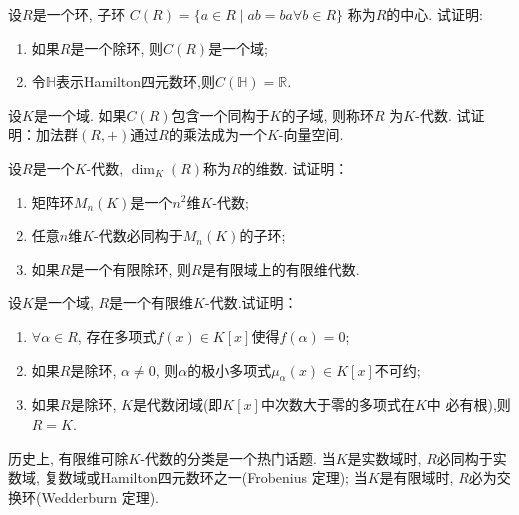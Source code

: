 \begin{solution}
    
\end{solution}

\begin{problem}
    设$R$是一个环, 子环
$C(R) = \{a \in R \mid ab = ba \forall b \in R\}$
称为$R$的中心. 试证明:
\begin{enumerate}[(1)]
    \item 如果$R$是一个除环, 则$C(R)$是一个域;
    \item 令$\mathbb{H}$表示Hamilton四元数环,则$C(\mathbb{H}) = \mathbb{R}$.
\end{enumerate}
\end{problem}

\begin{solution}
    
\end{solution}

\begin{problem}
    设$K$是一个域. 如果$C(R)$包含一个同构于$K$的子域, 则称环$R$
为$K$-代数. 试证明：加法群$(R, +)$通过$R$的乘法成为一个$K$-向量空间.
\end{problem}

\begin{solution}
    
\end{solution}

\begin{problem}
    设$R$是一个$K$-代数, $\dim_K(R)$称为$R$的维数.
试证明：
\begin{enumerate}[(1)]
    \item 矩阵环$M_n(K)$是一个$n^2$维$K$-代数;
    \item 任意$n$维$K$-代数必同构于$M_n(K)$的子环;
    \item 如果$R$是一个有限除环, 则$R$是有限域上的有限维代数.
\end{enumerate}
\end{problem}

\begin{solution}
    
\end{solution}

\begin{problem}
    设$K$是一个域, $R$是一个有限维$K$-代数.试证明：
\begin{enumerate}[(1)]
    \item $\forall \alpha \in R$, 存在多项式$f(x) \in K[x]$使得$f(\alpha) = 0$;
    \item 如果$R$是除环, $\alpha \neq 0$, 则$\alpha$的极小多项式$\mu_\alpha(x) \in K[x]$不可约;
    \item 如果$R$是除环, $K$是代数闭域(即$K[x]$中次数大于零的多项式在$K$中
必有根),则$R = K$.
\end{enumerate}
历史上, 有限维可除$K$-代数的分类是一个热门话题. 当$K$是实数域时, $R$必同构于实数域,
复数域或Hamilton四元数环之一(Frobenius 定理);
当$K$是有限域时, $R$必为交换环(Wedderburn 定理).
\end{problem}

